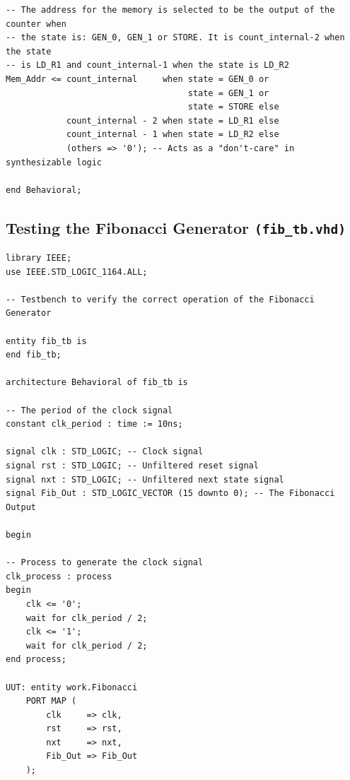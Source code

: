 \documentclass[10pt]{article}
\begin{document}
\newpage
\begin{verbatim}
-- The address for the memory is selected to be the output of the counter when 
-- the state is: GEN_0, GEN_1 or STORE. It is count_internal-2 when the state 
-- is LD_R1 and count_internal-1 when the state is LD_R2
Mem_Addr <= count_internal     when state = GEN_0 or
                                    state = GEN_1 or
                                    state = STORE else
            count_internal - 2 when state = LD_R1 else 
            count_internal - 1 when state = LD_R2 else
            (others => '0'); -- Acts as a "don't-care" in synthesizable logic
           
end Behavioral;
\end{verbatim}
\newpage

\subsection{Testing the Fibonacci Generator \texttt{(fib\_tb.vhd)}}
\begin{verbatim}
library IEEE;
use IEEE.STD_LOGIC_1164.ALL;

-- Testbench to verify the correct operation of the Fibonacci Generator

entity fib_tb is
end fib_tb;

architecture Behavioral of fib_tb is

-- The period of the clock signal
constant clk_period : time := 10ns;

signal clk : STD_LOGIC; -- Clock signal
signal rst : STD_LOGIC; -- Unfiltered reset signal
signal nxt : STD_LOGIC; -- Unfiltered next state signal
signal Fib_Out : STD_LOGIC_VECTOR (15 downto 0); -- The Fibonacci Output

begin

-- Process to generate the clock signal
clk_process : process
begin
    clk <= '0';
    wait for clk_period / 2;
    clk <= '1';
    wait for clk_period / 2;
end process;

UUT: entity work.Fibonacci
    PORT MAP (
        clk     => clk,
        rst     => rst,
        nxt     => nxt,
        Fib_Out => Fib_Out
    );
\end{verbatim}
\newpage
\end{document}
